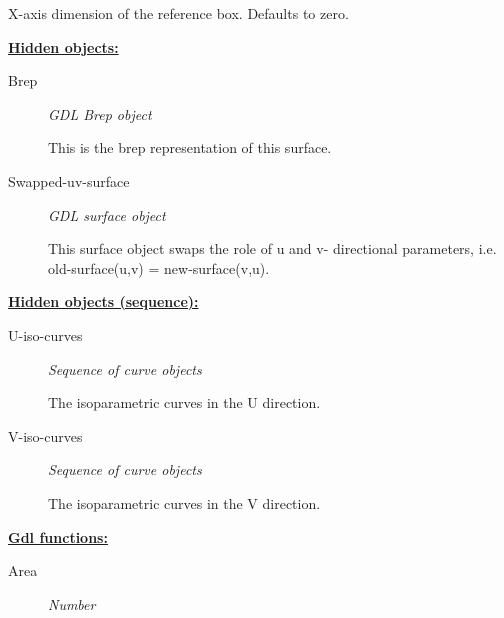 \documentclass [11pt]{book}
\begin{document}
\begin{itemize}
\begin{description}
 X-axis dimension of the reference box. Defaults to zero.




\end{description}






\textbf{
\underline{Hidden objects:}}

\begin{description}

\item [Brep]
\emph{GDL Brep object}

 This is the brep representation of this surface.




\item [Swapped-uv-surface]
\emph{GDL surface object}

 This surface object swaps the role of u and v- directional parameters, i.e. old-surface(u,v) = new-surface(v,u).




\end{description}






\textbf{
\underline{Hidden objects (sequence):}}

\begin{description}

\item [U-iso-curves]
\emph{Sequence of curve objects}

 The isoparametric curves in the U direction.




\item [V-iso-curves]
\emph{Sequence of curve objects}

 The isoparametric curves in the V direction.




\end{description}






\textbf{
\underline{Gdl functions:}}

\begin{description}

\item [Area]
\emph{Number}


\end{description}
\end{itemize}
\end{document}
